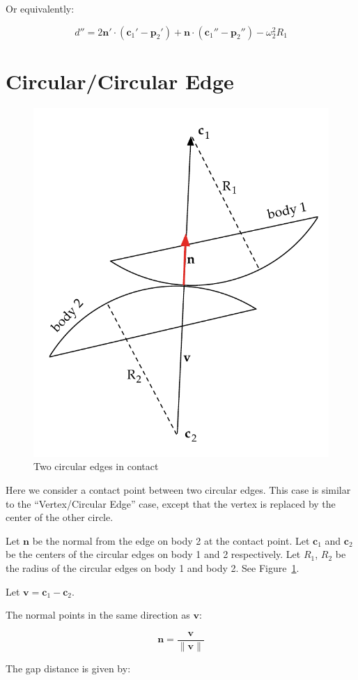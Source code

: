 \documentclass[final]{article}
\begin{document}
Or equivalently:

\begin{equation}\label{straight_circle_accel_3}
  d'' =  2 \mathbf{n}' \cdot (\mathbf{c}_1' - \mathbf{p}_2')
      + \mathbf{n} \cdot (\mathbf{c}_1'' - \mathbf{p}_2'') - \omega_2^2 R_1
\end{equation}



\section{Circular/Circular Edge}

\begin{figure}[ht]
    \centering
    \includegraphics[width=0.45 \textwidth]{CEP_circle_circle_edge.pdf}
    \caption{Two circular edges in contact}
    \label{fig:circle_circle_edge}
\end{figure}

Here we consider a contact point between two circular edges. This case is similar to the
``Vertex/Circular Edge'' case, except that the vertex is replaced by the center of the
other circle.

Let $\mathbf{n}$ be the normal from the edge on body 2 at the contact point. Let
$\mathbf{c}_1$ and $\mathbf{c}_2$ be the centers of the circular edges on body 1 and 2
respectively. Let $R_1$, $R_2$ be the radius of the circular edges on body 1 and body 2.
See Figure~\ref{fig:circle_circle_edge}.


Let $\mathbf{v} = \mathbf{c}_1 - \mathbf{c}_2$.

The normal points in the same direction as $\mathbf{v}$:

\[
  \mathbf{n} = \frac { \mathbf{v} } { \|\mathbf{v}\| }
\]

The gap distance is given by:
\end{document}
